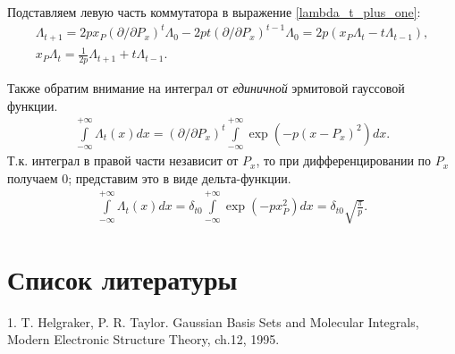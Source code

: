 \documentclass[a4paper,12pt]{extarticle}
\newcommand{\lb}{\left(}
\newcommand{\rb}{\right)}
\newcommand{\intfty}{\int\limits_{-\infty}^{+\infty}}
\begin{document}
Подставляем левую часть коммутатора в выражение \eqref{lambda_t_plus_one}:
\begin{gather}
	\Lambda_{t + 1} = 2p x_P (\partial/\partial P_x)^t \Lambda_0  - 2p t (\partial/\partial P_x)^{t - 1} \Lambda_0 = 2p \lb x_P \Lambda_t - t \Lambda_{t - 1} \rb, \\
	x_P \Lambda_t = \frac{1}{2 p} \Lambda_{t + 1} + t \Lambda_{t - 1}.
\end{gather}

Также обратим внимание на интеграл от \textit{единичной} эрмитовой гауссовой функции.
\begin{gather}
	\intfty \Lambda_t(x) dx = \lb \partial/\partial P_x \rb^t \intfty \exp (-p (x - P_x)^2 ) dx.
\end{gather}
Т.к. интеграл в правой части независит от $P_x$, то при дифференцировании по $P_x$ получаем 0; представим это в виде дельта-функции.
\begin{gather}
	\intfty \Lambda_t (x) dx = \delta_{t0} \intfty \exp \lb - p x_P^2 \rb dx = \delta_{t0} \sqrt{\frac{\pi}{p}}.
\end{gather}



\newpage
\section*{Список литературы}
1. T. Helgraker, P. R. Taylor. Gaussian Basis Sets and Molecular Integrals, Modern Electronic Structure Theory, ch.12, 1995.
\end{document}
